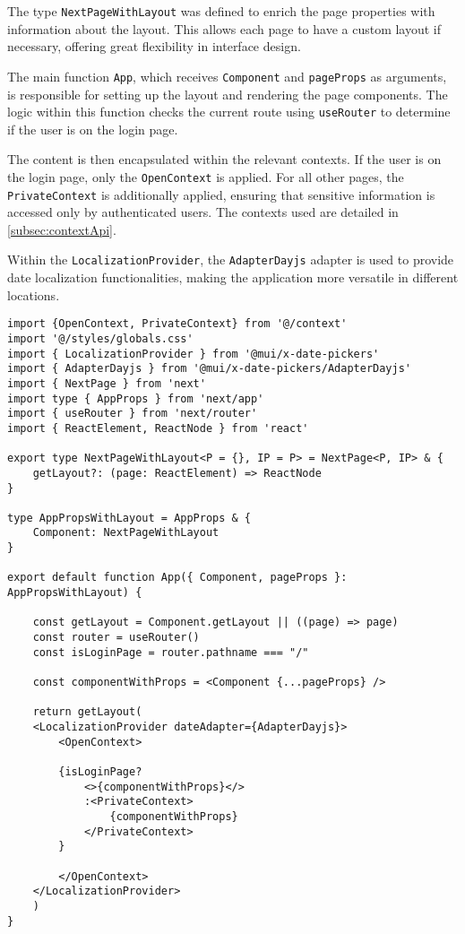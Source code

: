 The type \texttt{NextPageWithLayout} was defined to enrich the page properties with information about the layout. This allows each page to have a custom layout if necessary, offering great flexibility in interface design.

The main function \texttt{App}, which receives \texttt{Component} and \texttt{pageProps} as arguments, is responsible for setting up the layout and rendering the page components. The logic within this function checks the current route using \texttt{useRouter} \cite{nextjsUseRouter} to determine if the user is on the login page.

The content is then encapsulated within the relevant contexts. If the user is on the login page, only the \texttt{OpenContext} is applied. For all other pages, the \texttt{PrivateContext} is additionally applied, ensuring that sensitive information is accessed only by authenticated users. The contexts used are detailed in \ref{subsec:contextApi}.

Within the \texttt{LocalizationProvider}, the \texttt{AdapterDayjs} adapter is used to provide date localization functionalities, making the application more versatile in different locations.


\begin{verbatim}
import {OpenContext, PrivateContext} from '@/context'
import '@/styles/globals.css'
import { LocalizationProvider } from '@mui/x-date-pickers'
import { AdapterDayjs } from '@mui/x-date-pickers/AdapterDayjs'
import { NextPage } from 'next'
import type { AppProps } from 'next/app'
import { useRouter } from 'next/router'
import { ReactElement, ReactNode } from 'react'

export type NextPageWithLayout<P = {}, IP = P> = NextPage<P, IP> & {
    getLayout?: (page: ReactElement) => ReactNode
}

type AppPropsWithLayout = AppProps & {
    Component: NextPageWithLayout
}

export default function App({ Component, pageProps }:
AppPropsWithLayout) {

    const getLayout = Component.getLayout || ((page) => page)
    const router = useRouter()
    const isLoginPage = router.pathname === "/"

    const componentWithProps = <Component {...pageProps} /> 

    return getLayout(
    <LocalizationProvider dateAdapter={AdapterDayjs}>
        <OpenContext>

        {isLoginPage?
            <>{componentWithProps}</>
            :<PrivateContext>
                {componentWithProps}
            </PrivateContext>
        }

        </OpenContext>  
    </LocalizationProvider>
    )
}
\end{verbatim}

